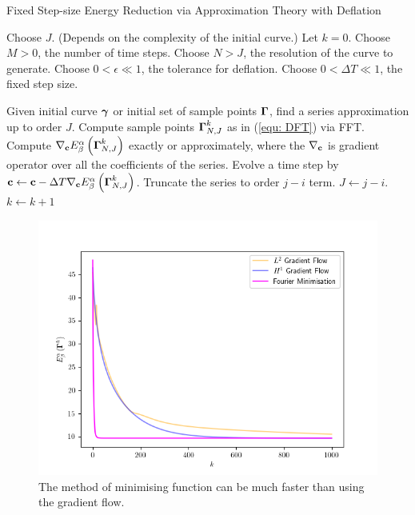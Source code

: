 \documentclass[../dissertation.tex]{subfiles}
\begin{document}
\begin{algorithm}[tbp]
    \caption{Fixed Step-size Energy Reduction via Approximation Theory with Deflation}
    \label{alg: Energy Reduction via Approximation Theory with Deflation}
    \begin{algorithmic}
        \State Choose $J$. (Depends on the complexity of the initial curve.)
        \State Let $k=0$.
        \State Choose $M > 0$, the number of time steps.
        \State Choose $N > J$, the resolution of the curve to generate.
        \State Choose $0 < \epsilon \ll 1$, the tolerance for deflation.
        \State Choose $0 < \Delta T \ll 1$, the fixed step size.

        \State Given initial curve $\boldsymbol{\gamma}$ or initial set of sample points $\boldsymbol{\Gamma}$, find a series approximation up to order $J$.
        \State Compute sample points $\boldsymbol{\Gamma}_{N,J}^k$ as in (\ref{equ: DFT}) via FFT.
        \State Compute $\nabla_{\mathbf{c}} E_{\beta}^{\alpha} \left( \boldsymbol{\Gamma}_{N,J}^k \right)$ exactly or approximately, where the $\nabla_{\mathbf{c}}$ is gradient operator over all the coefficients of the series.
        \State Evolve a time step by $\mathbf{c} \leftarrow \mathbf{c} - \Delta T \nabla_{\mathbf{c}} E_{\beta}^{\alpha} \left( \boldsymbol{\Gamma}_{N,J}^k \right)$.
        \State Truncate the series to order $j-i$ term.
        \State $J \leftarrow j-i$.
        \EndIf
        \State $k \leftarrow k+1$
        \EndWhile
    \end{algorithmic}
\end{algorithm}

\begin{figure}[tbp]
    \centering
    \includegraphics{sections/conclusionImgs/UnknottingEnergiesProgress}
    \caption{The method of minimising function can be much faster than using the gradient flow.}
    \label{fig: UnknottingEnergiesProgress}
\end{figure}
\end{document}
